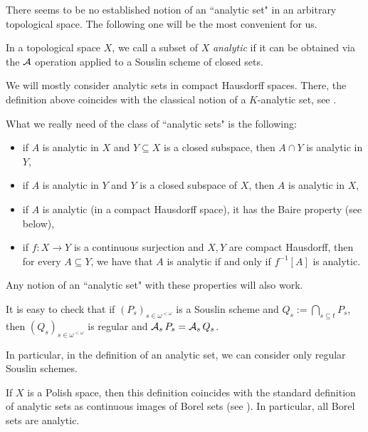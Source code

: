 	There seems to be no established notion of an ``analytic set" in an arbitrary topological space. The following one will be the most convenient for us.
	
	\begin{dfn}\label{definition: analytic sets}
		In a topological space $X$, we call a subset of $X$ \emph{analytic} if it can be obtained via the $\operatorname{{\mathcal A}}$ operation applied to a Souslin scheme of closed sets.\xqed{\lozenge}
	\end{dfn}
	
	\begin{rem}
		We will mostly consider analytic sets in compact Hausdorff spaces. There, the definition above coincides with the classical notion of a $K$-analytic set, see \cite[Théorème 1]{Cho59}.\xqed{\lozenge}
	\end{rem}
	
	\begin{rem}
		What we really need of the class of ``analytic sets" is the following:
		\begin{itemize}
			\item
			if $A$ is analytic in $X$ and $Y\subseteq X$ is a closed subspace, then $A\cap Y$ is analytic in $Y$,
			\item
			if $A$ is analytic in $Y$ and $Y$ is a closed subspace of $X$, then $A$ is analytic in $X$,
			\item
			if $A$ is analytic (in a compact Hausdorff space), it has the Baire property (see below),
			\item
			if $f\colon X\to Y$ is a continuous surjection and $X,Y$ are compact Hausdorff, then for every $A\subseteq Y$, we have that $A$ is analytic if and only if $f^{-1}[A]$ is analytic.
		\end{itemize}
		Any notion of an ``analytic set" with these properties will also work.\xqed{\lozenge}
	\end{rem}
	
	\begin{rem}
		It is easy to check that if
		$(P_s)_{s \in \omega^{<\omega}}$ is a Souslin scheme and $Q_s:= \bigcap_{s \subseteq t} P_s$, then $(Q_s)_{s \in \omega^{<\omega}}$ is regular and $\operatorname{{\mathcal A}}_s P_s =\operatorname{{\mathcal A}}_s Q_s$.
		
		
		In particular, in the definition of an analytic set, we can consider only regular Souslin schemes.\xqed{\lozenge}
	\end{rem}
	
	\begin{rem}
		If $X$ is a Polish space, then this definition coincides with the standard definition of analytic sets as continuous images of Borel sets (see \cite[Theorem 25.7]{Kec95}). In particular, all Borel sets are analytic.\xqed{\lozenge}
	\end{rem}
	
